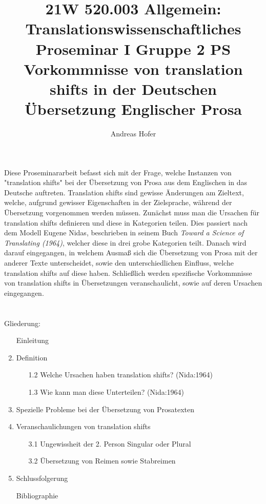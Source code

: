 \documentclass{article}
\title{21W 520.003 Allgemein: Translationswissenschaftliches Proseminar I Gruppe 2 PS \\ 
					Vorkommnisse von translation shifts in der Deutschen Übersetzung Englischer Prosa}
\author{Andreas Hofer}
\begin{document}
	\maketitle
	Diese Proseminararbeit befasst sich mit der Frage, welche Instanzen von "translation shifts" bei der Übersetzung von Prosa aus dem Englischen in das Deutsche auftreten. Translation shifts sind gewisse Änderungen am Zieltext, welche, aufgrund gewisser Eigenschaften in der Zielsprache, während der Übersetzung vorgenommen werden müssen. Zunächst muss man die Ursachen für translation shifts definieren und diese in Kategorien teilen. Dies passiert nach dem Modell Eugene Nidas, beschrieben in seinem Buch \textit{Toward a Science of Translating (1964)}, welcher diese in drei grobe Kategorien teilt. Danach wird darauf eingegangen, in welchem Ausmaß sich die Übersetzung von Prosa mit der anderer Texte unterscheidet, sowie den unterschiedlichen Einfluss, welche translation shifts auf diese haben. Schließlich werden spezifische Vorkommnisse von translation shifts in Übersetzungen veranschaulicht, sowie auf deren Ursachen eingegangen. \\ \\ \\
	Gliederung:
	\begin{enumerate}
		\item[]{Einleitung}
		\item{Definition}
		\begin{enumerate}
			\item[1.2]{Welche Ursachen haben translation shifts? (Nida:1964)}
			\item[1.3]{Wie kann man diese Unterteilen? (Nida:1964)}
		\end{enumerate}
		\item{Spezielle Probleme bei der Übersetzung von Prosatexten}
		\item{Veranschaulichungen von translation shifts}
		\begin{enumerate}
			\item[3.1]{Ungewissheit der 2. Person Singular oder Plural}
			\item[3.2]{Übersetzung von Reimen sowie Stabreimen}
		\end{enumerate}
		\item{Schlussfolgerung}
		\item[]{Bibliographie}
	\end{enumerate}
\end{document}
